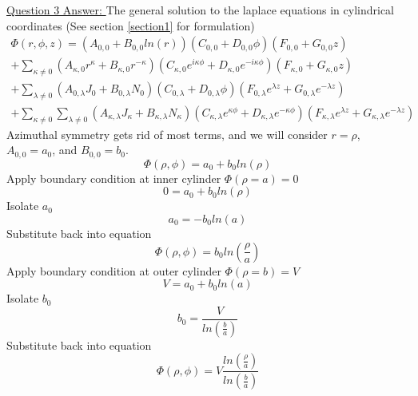 \documentclass[12pt]{article}
\begin{document}
    \underline{Question 3 Answer: }
    The general solution to the laplace equations in cylindrical coordinates (See section \ref{section1} for formulation)
    \begin{gather*}
            \Phi(r,\phi,z) = (A_{0,0} + B_{0,0} ln(r)) (C_{0,0} + D_{0,0}\phi) (F_{0,0} + G_{0,0}z)
            \\ + \sum_{\kappa \neq 0}(A_{\kappa,0} r^\kappa + B_{\kappa,0} r^{-\kappa}) (C_{\kappa,0} e^{i \kappa \phi} + D_{\kappa,0} e^{-i \kappa \phi}) (F_{\kappa,0} + G_{\kappa,0} z)
            \\  + \sum_{\lambda \neq 0} (A_{0,\lambda} J_0 + B_{0,\lambda} N_0) (C_{0,\lambda} + D_{0,\lambda} \phi)(F_{0,\lambda} e^{\lambda z} + G_{0,\lambda} e^{-\lambda z})
            \\  + \sum_{\kappa \neq 0} \sum_{\lambda \neq 0} (A_{\kappa, \lambda} J_\kappa + B_{\kappa, \lambda} N_\kappa) (C_{\kappa,\lambda} e^{\kappa \phi} + D_{\kappa,\lambda} e^{- \kappa \phi})(F_{\kappa,\lambda} e^{\lambda z} + G_{\kappa,\lambda} e^{-\lambda z})
    \end{gather*}
    Azimuthal symmetry gets rid of most terms, and we will consider $r=\rho$, $A_{0,0}=a_0$, and $B_{0,0}=b_0$.
    \begin{equation} \label{eq: 3-2}
        \Phi(\rho, \phi) = a_0 + b_0 ln(\rho)
    \end{equation}
    Apply boundary condition at inner cylinder $\Phi(\rho=a)=0$
    \begin{equation} \label{eq: 3-3}
        0 = a_0 + b_0 ln(\rho)
    \end{equation}
    Isolate $a_0$
    \begin{equation} \label{eq: 3-4}
        a_0 = -b_0 ln(a)
    \end{equation}
    Substitute back into equation
    \begin{equation} \label{eq: 3-5}
        \Phi(\rho, \phi) = b_0 ln\left(\frac{\rho}{a} \right)
    \end{equation}
    Apply boundary condition at outer cylinder $\Phi(\rho=b)=V$
    \begin{equation} \label{eq: 3-6}
        V = a_0 + b_0 ln(a)
    \end{equation}
    Isolate $b_0$
    \begin{equation} \label{eq: 3-7}
        b_0 = \frac{V}{ln(\frac{b}{a})}
    \end{equation}
    Substitute back into equation
    \begin{equation} \label{eq: 3-8}
        \Phi(\rho, \phi) = V \frac{ln(\frac{\rho}{a})}{ln(\frac{b}{a})}
    \end{equation}
\end{document}
